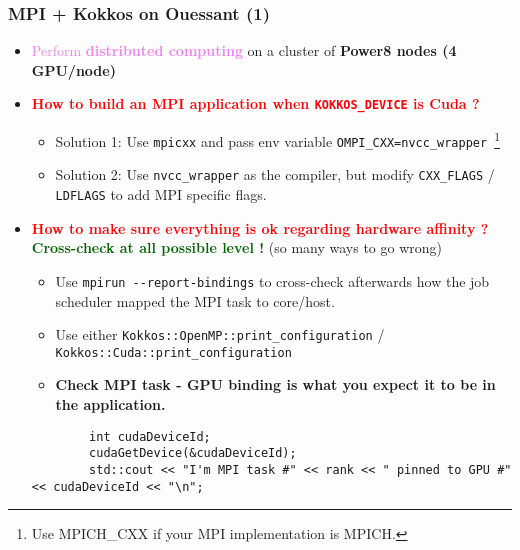 \begin{frame}[fragile=singleslide]
  \frametitle{MPI + Kokkos on Ouessant (1)}

  \begin{itemize}
  \item \textcolor{violet}{Perform \textbf{distributed computing}} on a cluster of \textbf{Power8 nodes (4 GPU/node)}
  \item \textcolor{red}{\bf How to build an MPI application when \texttt{KOKKOS\_DEVICE} is Cuda ?}
    \begin{itemize}
    \item Solution 1: Use \texttt{mpicxx} and pass env variable \texttt{OMPI\_CXX=nvcc\_wrapper}~\footnote{Use MPICH\_CXX if your MPI implementation is MPICH.}
    \item Solution 2: Use \texttt{nvcc\_wrapper} as the compiler, but modify \texttt{CXX\_FLAGS} / \texttt{LDFLAGS} to add MPI specific flags.
    \end{itemize}
  \item \textcolor{red}{\bf How to make sure everything is ok regarding hardware affinity ? }
    \textcolor{darkgreen}{\textbf{Cross-check at all possible level !}} (so many ways to go wrong)
    \begin{itemize}
    \item Use \texttt{mpirun \--\--report-bindings} to cross-check afterwards how the job scheduler mapped the MPI task to core/host.
    \item Use either \texttt{Kokkos::OpenMP::print\_configuration} / \texttt{Kokkos::Cuda::print\_configuration}
    \item {\bf Check MPI task - GPU binding is what you expect it to be in the application.}
    \end{itemize} 
    {\scriptsize
      \begin{verbatim}
        int cudaDeviceId;
        cudaGetDevice(&cudaDeviceId);
        std::cout << "I'm MPI task #" << rank << " pinned to GPU #" << cudaDeviceId << "\n";
      \end{verbatim}
    }
  \end{itemize}

\end{frame}

